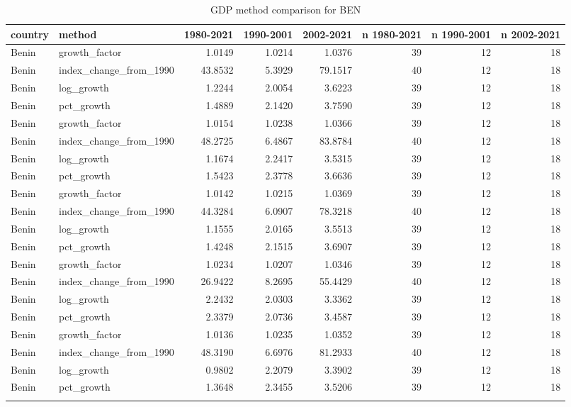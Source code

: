 \begin{table}

\caption{GDP method comparison for BEN}
\centering
\begin{tabular}[t]{llrrrrrr}
\toprule
country & method & 1980-2021 & 1990-2001 & 2002-2021 & n 1980-2021 & n 1990-2001 & n 2002-2021\\
\midrule
Benin & growth\_factor & 1.0149 & 1.0214 & 1.0376 & 39 & 12 & 18\\
Benin & index\_change\_from\_1990 & 43.8532 & 5.3929 & 79.1517 & 40 & 12 & 18\\
Benin & log\_growth & 1.2244 & 2.0054 & 3.6223 & 39 & 12 & 18\\
Benin & pct\_growth & 1.4889 & 2.1420 & 3.7590 & 39 & 12 & 18\\
Benin & growth\_factor & 1.0154 & 1.0238 & 1.0366 & 39 & 12 & 18\\
\addlinespace
Benin & index\_change\_from\_1990 & 48.2725 & 6.4867 & 83.8784 & 40 & 12 & 18\\
Benin & log\_growth & 1.1674 & 2.2417 & 3.5315 & 39 & 12 & 18\\
Benin & pct\_growth & 1.5423 & 2.3778 & 3.6636 & 39 & 12 & 18\\
Benin & growth\_factor & 1.0142 & 1.0215 & 1.0369 & 39 & 12 & 18\\
Benin & index\_change\_from\_1990 & 44.3284 & 6.0907 & 78.3218 & 40 & 12 & 18\\
\addlinespace
Benin & log\_growth & 1.1555 & 2.0165 & 3.5513 & 39 & 12 & 18\\
Benin & pct\_growth & 1.4248 & 2.1515 & 3.6907 & 39 & 12 & 18\\
Benin & growth\_factor & 1.0234 & 1.0207 & 1.0346 & 39 & 12 & 18\\
Benin & index\_change\_from\_1990 & 26.9422 & 8.2695 & 55.4429 & 40 & 12 & 18\\
Benin & log\_growth & 2.2432 & 2.0303 & 3.3362 & 39 & 12 & 18\\
\addlinespace
Benin & pct\_growth & 2.3379 & 2.0736 & 3.4587 & 39 & 12 & 18\\
Benin & growth\_factor & 1.0136 & 1.0235 & 1.0352 & 39 & 12 & 18\\
Benin & index\_change\_from\_1990 & 48.3190 & 6.6976 & 81.2933 & 40 & 12 & 18\\
Benin & log\_growth & 0.9802 & 2.2079 & 3.3902 & 39 & 12 & 18\\
Benin & pct\_growth & 1.3648 & 2.3455 & 3.5206 & 39 & 12 & 18\\
\addlinespace

\end{tabular}
\end{table}
